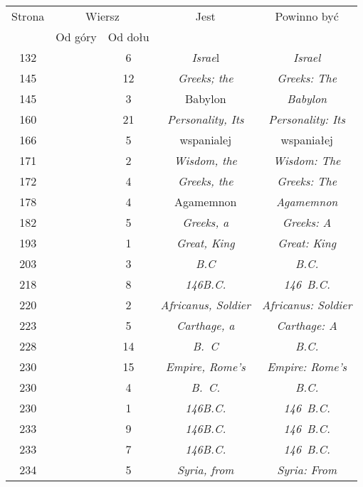 \documentclass[a4paper,11pt]{article}
\begin{document}
\begin{center}
  \newpage

  \begin{tabular}{|c|c|c|c|c|}
    \hline
    Strona & \multicolumn{2}{c|}{Wiersz} & Jest
                              & Powinno być \\ \cline{2-3}
    & Od góry & Od dołu & & \\
    \hline
    132 & & \hphantom{0}6 & \textit{Israe}l & \textit{Israel} \\
    145 & & 12 & \textit{Greeks; the} & \textit{Greeks: The} \\
    145 & & \hphantom{0}3 & Babylon & \textit{Babylon} \\
    160 & & 21 & \textit{Personality, Its} & \textit{Personality: Its} \\
    166 & & \hphantom{0}5 & wspanialej & wspaniałej \\
    171 & & \hphantom{0}2 & \textit{Wisdom, the} & \textit{Wisdom: The} \\
    172 & & \hphantom{0}4 & \textit{Greeks, the} & \textit{Greeks: The} \\
    178 & & \hphantom{0}4 & Agamemnon & \textit{Agamemnon} \\
    182 & & \hphantom{0}5 & \textit{Greeks, a} & \textit{Greeks: A} \\
    193 & & \hphantom{0}1 & \textit{Great, King} & \textit{Great: King} \\
    203 & & \hphantom{0}3 & \textit{B.C} & \textit{B.C.} \\
    218 & & \hphantom{0}8 & \textit{146B.C.} & \textit{146~B.C.} \\
    220 & & \hphantom{0}2 & \textit{Africanus, Soldier}
           & \textit{Africanus: Soldier} \\
    223 & & \hphantom{0}5 & \textit{Carthage, a} & \textit{Carthage: A} \\
    228 & & 14 & \textit{B.~C} & \textit{B.C.} \\
    230 & & 15 & \textit{Empire, Rome's} & \textit{Empire: Rome's} \\
    230 & & \hphantom{0}4 & \textit{B.~C.} & \textit{B.C.} \\
    230 & & \hphantom{0}1 & \textit{146B.C.} & \textit{146~B.C.} \\
    233 & & \hphantom{0}9 & \textit{146B.C.} & \textit{146~B.C.} \\
    233 & & \hphantom{0}7 & \textit{146B.C.} & \textit{146~B.C.} \\
    234 & & \hphantom{0}5 & \textit{Syria, from} & \textit{Syria: From} \\

\end{tabular}
\end{center}
\end{document}
